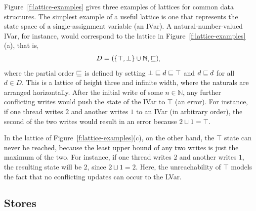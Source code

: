 Figure~\ref{f:lattice-examples} gives three examples of lattices for
common data structures.
The simplest example of a useful lattice is one that
represents the state space of a single-assignment variable (an IVar).
A natural-number-valued IVar, for instance, would correspond to the
lattice in Figure~\ref{f:lattice-examples}(a), that is,
\begin{displaymath}
  D = (\lbrace \top, \bot \rbrace \cup \mathbb{N}, \sqsubseteq), 
\end{displaymath}
where the partial order $\sqsubseteq$ is defined by setting $\bot \sqsubseteq d
\sqsubseteq \top$ and $d \sqsubseteq d$ for all $d \in D$.  This is a lattice of
height three and infinite width, where the naturals are arranged
horizontally.  After the initial write of some $n \in \mathbb{N}$, any
further conflicting writes would push the state of the IVar to $\top$
(an error).
For instance, if one thread writes $2$ and another writes $1$ to an
IVar (in arbitrary order), the second of the two writes would result
in an error because $2 \sqcup 1 = \top$.

In the lattice of Figure~\ref{f:lattice-examples}(c), on the other
hand, the $\top$ state can never be reached, because the least upper
bound of any two writes is just the maximum of the two.
For instance, if one thread writes $2$ and another writes $1$, the
resulting state will be $2$, since $2 \sqcup 1 = 2$.
Here, the
unreachability of $\top$ models the fact that no conflicting updates
can occur to the LVar.

\subsection{Stores}\label{subsection:stores}


